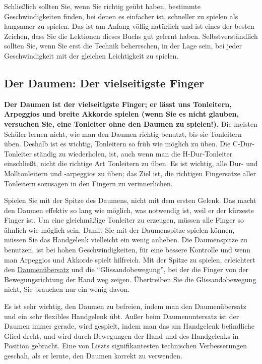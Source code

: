 Schließlich sollten Sie, wenn Sie richtig geübt haben, bestimmte Geschwindigkeiten finden, bei denen es einfacher ist, schneller zu spielen als langsamer zu spielen.
Das ist am Anfang völlig natürlich und ist eines der besten Zeichen, dass Sie die Lektionen dieses Buchs gut gelernt haben.
Selbstverständlich sollten Sie, wenn Sie erst die Technik beherrschen, in der Lage sein, bei jeder Geschwindigkeit mit der gleichen Leichtigkeit zu spielen.
 

\hypertarget{c1iii5g}{}
\subsection{Der Daumen: Der vielseitigste Finger}\hypertarget{Daumen}{}
\textbf{Der Daumen ist der vielseitigste Finger; er lässt uns Tonleitern, Arpeggios und breite Akkorde spielen (wenn Sie es nicht glauben, versuchen Sie, eine Tonleiter ohne den Daumen zu spielen!).}
Die meisten Schüler lernen nicht, wie man den Daumen richtig benutzt, bis sie Tonleitern üben.
Deshalb ist es wichtig, Tonleitern so früh wie möglich zu üben.
Die C-Dur-Tonleiter ständig zu wiederholen, ist, auch wenn man die H-Dur-Tonleiter einschließt, nicht die richtige Art Tonleitern zu üben.
Es ist wichtig, alle Dur- und Molltonleitern und -arpeggios zu üben; das Ziel ist, die richtigen Fingersätze aller Tonleitern sozusagen in den Fingern zu verinnerlichen. 

Spielen Sie mit der Spitze des Daumens, nicht mit dem ersten Gelenk.
Das macht den Daumen effektiv so lang wie möglich, was notwendig ist, weil er der kürzeste Finger ist.
Um eine gleichmäßige Tonleiter zu erzeugen, müssen alle Finger so ähnlich wie möglich sein.
Damit Sie mit der Daumenspitze spielen können, müssen Sie das Handgelenk vielleicht ein wenig anheben.
Die Daumenspitze zu benutzen, ist bei hohen Geschwindigkeiten, für eine bessere Kontrolle und wenn man Arpeggios und Akkorde spielt hilfreich.
Mit der Spitze zu spielen, erleichtert den \hyperlink{c1iii5b}{Daumenübersatz} und die \enquote{Glissandobewegung}, bei der die Finger von der Bewegungsrichtung der Hand weg zeigen.
Übertreiben Sie die Glissandobewegung nicht, Sie brauchen nur ein wenig davon.

Es ist sehr wichtig, den Daumen zu befreien, indem man den Daumenübersatz und ein sehr flexibles Handgelenk übt.
Außer beim Daumenuntersatz ist der Daumen immer gerade, wird gespielt, indem man das am Handgelenk befindliche Glied dreht, und wird durch Bewegungen der Hand und des Handgelenks in Position gebracht.
Eine von Liszts signifikantesten technischen Verbesserungen geschah, als er lernte, den Daumen korrekt zu verwenden.


